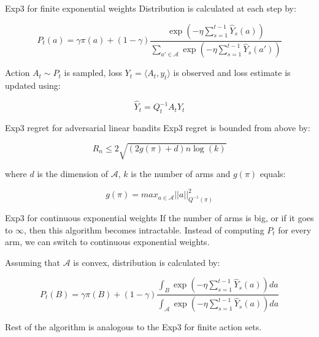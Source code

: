 \documentclass[aspectratio=169,xcolor=dvipsnames]{beamer}
\begin{document}
\begin{frame}{Exp3 for finite exponential weights}
    Distribution is calculated at each step by:

    \begin{equation}
        P_t(a) = \gamma \pi(a) + (1 - \gamma) \frac{\exp \left( - \eta \sum_{s=1}^{t-1} \hat{Y}_s(a) \right)}{\sum_{a' \in \mathbf{\mathcal{A}}} \exp \left( - \eta \sum_{s=1}^{t-1} \hat{Y}_s(a') \right)}
    \end{equation}

    Action $A_t \sim P_t$ is sampled, loss $Y_t = \langle A_t, y_t \rangle$ is observed and loss estimate is updated using:

    \begin{equation}
        \hat{Y}_t = Q_t^{-1} A_t Y_t
    \end{equation}

\end{frame}

\begin{frame}{Exp3 regret for adversarial linear bandits}
    Exp3 regret is bounded from above by:

    \begin{equation}
        R_n \leq 2 \sqrt{(2g(\pi) + d)n \log(k)}
    \end{equation}

    where $d$ is the dimension of $\mathbf{\mathcal{A}}$, $k$ is the number of arms and $g(\pi)$ equals:

    \begin{equation}
        g(\pi) = max_{a \in \mathbf{\mathcal{A}}} ||a||^2_{Q^{-1}(\pi)}
    \end{equation}
\end{frame}

\begin{frame}{Exp3 for continuous exponential weights}
    If the number of arms is big, or if it goes to $\infty$, then this algorithm becomes intractable. Instead of computing $P_t$ for every arm, we can switch to continuous exponential weights.
    
    Assuming that $\mathbf{\mathcal{A}}$ is convex, distribution is calculated by:

    \begin{equation}
        P_t(B) = \gamma \pi(B) + (1-\gamma) \frac{\int_B \exp \left( - \eta \sum_{s=1}^{t-1} \hat{Y}_s(a) \right)da}{\int_\mathbf{\mathcal{A}} \exp \left( - \eta \sum_{s=1}^{t-1} \hat{Y}_s(a) \right)da}
    \end{equation}

    Rest of the algorithm is analogous to the Exp3 for finite action sets.
\end{frame}
\end{document}
